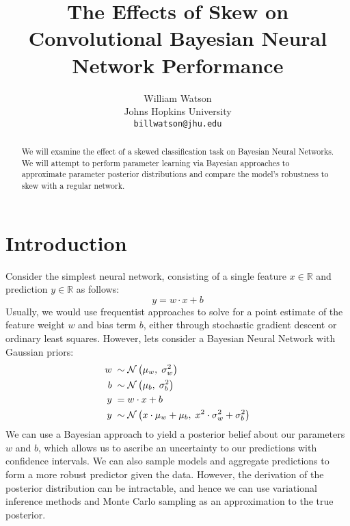 \documentclass{article}
\title{The Effects of Skew on Convolutional Bayesian Neural Network Performance}
\author{%
  William Watson \\
  Johns Hopkins University\\
  \texttt{billwatson@jhu.edu} \\
}
\begin{document}

\maketitle

\begin{abstract}
  We will examine the effect of a skewed classification task on Bayesian Neural
  Networks. We will attempt to perform parameter learning via Bayesian approaches
  to approximate parameter posterior distributions and compare the model's
  robustness to skew with a regular network.
\end{abstract}

\section{Introduction}
Consider the simplest neural network, consisting of a single feature $x \in \mathbb{R}$ and
prediction $y \in \mathbb{R}$ as follows:
\begin{equation}
  y = w \cdot x + b
\end{equation}
Usually, we would use frequentist approaches to solve for a point estimate of
the feature weight $w$ and bias term $b$, either through stochastic gradient
descent or ordinary least squares.
However, lets consider a Bayesian Neural Network with Gaussian priors:
\begin{equation}
  \centering
  \begin{split}
    w \; \sim & \; \mathcal{N}\left( \mu_w,\; \sigma^2_w \right) \\
    b \; \sim & \; \mathcal{N}\left( \mu_b,\; \sigma^2_b \right) \\
    y \; = & \; w \cdot x + b \\
    y \; \sim & \; \mathcal{N}\left( x \cdot \mu_w + \mu_b,\; x^2 \cdot \sigma^2_w + \sigma^2_b \right) \\
  \end{split}
\end{equation}
We can use a Bayesian approach to yield a posterior belief about our parameters
$w$ and $b$, which allows us to ascribe an uncertainty to our predictions with confidence intervals.
We can also sample models and aggregate predictions to form a more
robust predictor given the data.
However, the derivation of the posterior distribution can be intractable, and
hence we can use variational inference methods and Monte Carlo sampling as an
approximation to the true posterior.
\end{document}
